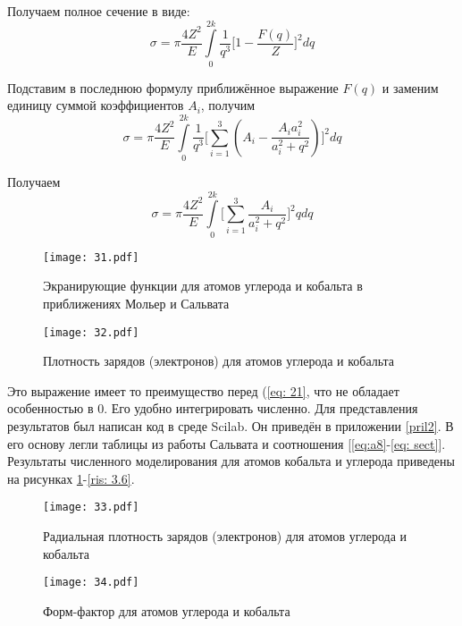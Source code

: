 \documentclass[a4paper,14pt]{extarticle} %
\begin{document}
Получаем полное сечение в виде:
\begin{equation}
\sigma =
\pi \frac{4Z^2}{E}
\int\limits_0^{2k}
\frac{1}{q^3}
	\Big[
		1 - \frac{F(q)}{Z}
	\Big]^2
dq 
\label{eq: 21}
\end{equation}

Подставим в последнюю формулу приближённое выражение $F(q)$ и заменим единицу суммой коэффициентов $A_i$, получим
\begin{equation*}
\sigma =
\pi \frac{4Z^2}{E}
\int\limits_0^{2k}
\frac{1}{q^3}
	\Big[
		\sum_{i=1}^3 \left( A_i - \frac{A_ia_i^2}{a_i^2+q^2} \right)
	\Big]^2
dq
\end{equation*}

Получаем
\begin{equation}
\sigma =
\pi \frac{4Z^2}{E}
\int\limits_0^{2k}
	\Big[
		\sum_{i=1}^3 \frac{A_i}{a_i^2+q^2}
	\Big]^2 q
dq \label{eq: sect}
\end{equation}

	\begin{figure}[hb!]
	\centering
	\caption{Экранирующие функции для атомов углерода и кобальта в приближениях Мольер и Сальвата}
	\label{ris: 3.1}
	\texttt{[image: 31.pdf]}
	\end{figure}
	
	\begin{figure}[ht!]
		\centering
		\caption{Плотность зарядов (электронов) для атомов углерода и кобальта}
		\label{ris: 3.2}
		\texttt{[image: 32.pdf]}
	\end{figure}
	\newpage

Это выражение имеет то преимущество перед (\ref{eq: 21}, что не обладает особенностью в 0. Его удобно интегрировать численно. Для представления результатов был написан код в среде Scilab. Он приведён в приложении \ref{pril2}. В его основу легли таблицы из работы Сальвата \cite{Salvat} и соотношения [\ref{eq:a8}-\ref{eq: sect}]. Результаты численного моделирования для атомов кобальта и углерода приведены на рисунках \ref{ris: 3.1}-\ref{ris: 3.6}.

	\begin{figure}[h!]
		\centering
		\caption{Радиальная плотность зарядов (электронов) для атомов углерода и кобальта}
		\label{ris: 3.3}
		\texttt{[image: 33.pdf]}
	\end{figure}
	
	\begin{figure}[h!]
		\centering
		\caption{Форм-фактор для атомов углерода и кобальта}
		\label{ris: 3.4}
		\texttt{[image: 34.pdf]}
	\end{figure}
	\newpage
		
\end{document}
